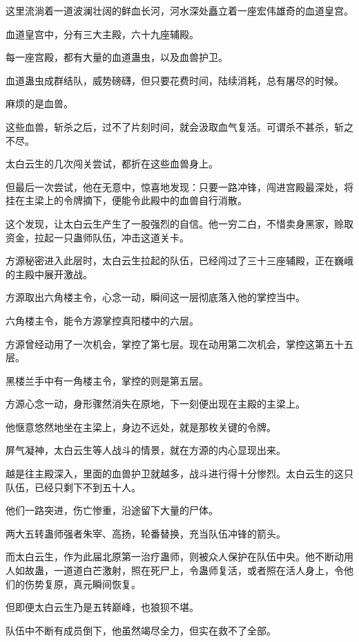 \begin{this_body}
这里流淌着一道波澜壮阔的鲜血长河，河水深处矗立着一座宏伟雄奇的血道皇宫。

血道皇宫中，分有三大主殿，六十九座辅殿。

每一座宫殿，都有大量的血道蛊虫，以及血兽护卫。

血道蛊虫成群结队，威势磅礴，但只要花费时间，陆续消耗，总有屠尽的时候。

麻烦的是血兽。

这些血兽，斩杀之后，过不了片刻时间，就会汲取血气复活。可谓杀不甚杀，斩之不尽。

太白云生的几次闯关尝试，都折在这些血兽身上。

但最后一次尝试，他在无意中，惊喜地发现：只要一路冲锋，闯进宫殿最深处，将挂在主梁上的令牌摘下，便能令此殿中的血兽自行消散。

这个发现，让太白云生产生了一股强烈的自信。他一穷二白，不惜卖身黑家，赊取资金，拉起一只蛊师队伍，冲击这道关卡。

方源秘密进入此层时，太白云生拉起的队伍，已经闯过了三十三座辅殿，正在巍峨的主殿中展开激战。

方源取出六角楼主令，心念一动，瞬间这一层彻底落入他的掌控当中。

六角楼主令，能令方源掌控真阳楼中的六层。

方源曾经动用了一次机会，掌控了第七层。现在动用第二次机会，掌控这第五十五层。

黑楼兰手中有一角楼主令，掌控的则是第五层。

方源心念一动，身形骤然消失在原地，下一刻便出现在主殿的主梁上。

他惬意悠然地坐在主梁上，身边不远处，就是那枚关键的令牌。

屏气凝神，太白云生等人战斗的情景，就在方源的内心显现出来。

越是往主殿深入，里面的血兽护卫就越多，战斗进行得十分惨烈。太白云生的这只队伍，已经只剩下不到五十人。

他们一路突进，伤亡惨重，沿途留下大量的尸体。

两大五转蛊师强者朱宰、高扬，轮番替换，充当队伍冲锋的箭头。

而太白云生，作为此届北原第一治疗蛊师，则被众人保护在队伍中央。他不断动用人如故蛊，一道道白芒激射，照在死尸上，令蛊师复活，或者照在活人身上，令他们的伤势复原，真元瞬间恢复。

但即便太白云生乃是五转巅峰，也狼狈不堪。

队伍中不断有成员倒下，他虽然竭尽全力，但实在救不了全部。


\end{this_body}
